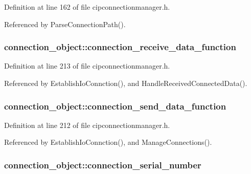 \-Definition at line 162 of file cipconnectionmanager.\-h.



\-Referenced by \-Parse\-Connection\-Path().

\hypertarget{structconnection__object_af885b8e00c36002715d9cbb32b56f3a2}{
\subsubsection[{connection\-\_\-receive\-\_\-data\-\_\-function}]{ {\bf connection\-\_\-object\-::connection\-\_\-receive\-\_\-data\-\_\-function}}}\label{d1/d48/structconnection__object_af885b8e00c36002715d9cbb32b56f3a2}


\-Definition at line 213 of file cipconnectionmanager.\-h.



\-Referenced by \-Establish\-Io\-Connction(), and \-Handle\-Received\-Connected\-Data().

\hypertarget{structconnection__object_ab54770913f007d4ca02e10835352649d}{
\subsubsection[{connection\-\_\-send\-\_\-data\-\_\-function}]{ {\bf connection\-\_\-object\-::connection\-\_\-send\-\_\-data\-\_\-function}}}\label{d1/d48/structconnection__object_ab54770913f007d4ca02e10835352649d}


\-Definition at line 212 of file cipconnectionmanager.\-h.



\-Referenced by \-Establish\-Io\-Connction(), and \-Manage\-Connections().

\hypertarget{structconnection__object_ad769130c9d4e6725c5be513a3d54e1fe}{
\subsubsection[{connection\-\_\-serial\-\_\-number}]{ {\bf connection\-\_\-object\-::connection\-\_\-serial\-\_\-number}}}\label{d1/d48/structconnection__object_ad769130c9d4e6725c5be513a3d54e1fe}


